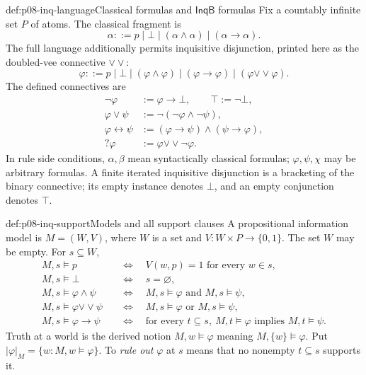 \begin{hbdefinition}{def:p08-inq-language}{Classical formulas and \(\mathsf{InqB}\) formulas}
Fix a countably infinite set \(P\) of atoms. The classical fragment is
\[
 \alpha ::=p\mid\bot\mid(\alpha\land\alpha)\mid(\alpha\to\alpha).
\]
The full language additionally permits inquisitive disjunction, printed here
as the doubled-vee connective \(\mathbin{\vee\!\vee}\):
\[
 \varphi ::=p\mid\bot\mid(\varphi\land\varphi)\mid
 (\varphi\to\varphi)\mid(\varphi\mathbin{\vee\!\vee}\varphi).
\]
The defined connectives are
\[
\begin{aligned}
 \neg\varphi&:=\varphi\to\bot,\qquad \top:=\neg\bot,\\
 \varphi\lor\psi&:=\neg(\neg\varphi\land\neg\psi),\\
 \varphi\leftrightarrow\psi&:=(\varphi\to\psi)\land(\psi\to\varphi),\\
 ?\varphi&:=\varphi\mathbin{\vee\!\vee}\neg\varphi.
\end{aligned}
\]
In rule side conditions, \(\alpha,\beta\) mean syntactically classical
formulas; \(\varphi,\psi,\chi\) may be arbitrary formulas. A finite iterated
inquisitive disjunction is a bracketing of the binary connective; its empty
instance denotes \(\bot\), and an empty conjunction denotes \(\top\).
\end{hbdefinition}

\begin{hbdefinition}{def:p08-inq-support}{Models and all support clauses}
A propositional information model is \(M=(W,V)\), where \(W\) is a set and
\(V:W\times P\to\{0,1\}\). The set \(W\) may be empty. For \(s\subseteq W\),
\[
\begin{aligned}
 M,s\models p&\quad\Longleftrightarrow\quad V(w,p)=1\text{ for every }w\in s,\\
 M,s\models\bot&\quad\Longleftrightarrow\quad s=\varnothing,\\
 M,s\models\varphi\land\psi&\quad\Longleftrightarrow\quad
 M,s\models\varphi\text{ and }M,s\models\psi,\\
 M,s\models\varphi\mathbin{\vee\!\vee}\psi&\quad\Longleftrightarrow\quad
 M,s\models\varphi\text{ or }M,s\models\psi,\\
 M,s\models\varphi\to\psi&\quad\Longleftrightarrow\quad
 \text{for every }t\subseteq s,
 \ M,t\models\varphi\text{ implies }M,t\models\psi.
\end{aligned}
\]
Truth at a world is the derived notion \(M,w\models\varphi\) meaning
\(M,\{w\}\models\varphi\). Put
\(|\varphi|_M=\{w:M,w\models\varphi\}\).
To \emph{rule out} \(\varphi\) at \(s\) means that no nonempty
\(t\subseteq s\) supports it.
\end{hbdefinition}


